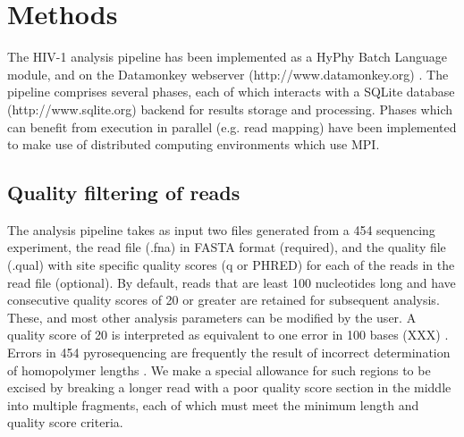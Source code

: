 \documentclass[10pt]{article}
\begin{document}
\section*{Methods}
The HIV-1 analysis pipeline has been implemented as a HyPhy \cite{KosakovskyPond2005} Batch Language module,
and on the Datamonkey webserver (http://www.datamonkey.org) \cite{KosakovskyPond2005a,Delport2010}.
The pipeline comprises several phases,
each of which interacts with a SQLite database (http://www.sqlite.org) backend for results storage and processing.
Phases which can benefit from execution in parallel (e.g. read mapping) have been implemented to make use of distributed computing environments which use MPI.

\subsection*{Quality filtering of reads}
The analysis pipeline takes as input two files generated from a 454 sequencing experiment,
the read file (.fna) in FASTA format (required), and the quality file (.qual) with site specific quality scores (q or PHRED)
for each of the reads in the read file (optional).
By default, reads that are least 100 nucleotides long and have consecutive quality scores of 20 or greater are retained for subsequent analysis.
These, and most other analysis parameters can be modified by the user.
A quality score of 20 is interpreted as equivalent to one error in 100 bases (XXX) \cite{}.
Errors in 454 pyrosequencing are frequently the result of incorrect determination of homopolymer lengths \cite{Wang2007}.
We make a special allowance for such regions to be excised by breaking a longer read with a poor quality score section in the middle into multiple fragments,
each of which must meet the minimum length and quality score criteria.
\end{document}
